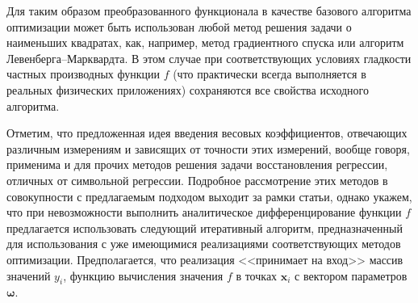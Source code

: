 \documentclass[tikz,10pt,a4paper]{article}
\newcommand{\bomega}{\boldsymbol{\omega}}
\begin{document}

Для таким образом преобразованного функционала
в качестве базового алгоритма оптимизации может
быть использован любой метод решения задачи о наименьших квадратах, как, например,
метод градиентного спуска или алгоритм Левенберга--Марквардта\cite{dlib09}.
В этом случае при
соответствующих условиях гладкости частных производных функции $f$ (что практически
всегда выполняется в реальных физических приложениях) сохраняются все свойства
исходного алгоритма.

Отметим, что предложенная идея введения весовых коэффициентов, отвечающих различным
измерениям и зависящих от точности этих измерений, вообще говоря, применима и для
прочих методов решения задачи восстановления регрессии, отличных от символьной регрессии.
Подробное рассмотрение этих методов в совокупности с предлагаемым подходом выходит за рамки
статьи, однако укажем, что при невозможности выполнить аналитическое
дифференцирование функции $f$ предлагается использовать следующий
итеративный алгоритм, предназначенный для использования с уже имеющимися
реализациями соответствующих методов оптимизации. Предполагается, что реализация
<<принимает на вход>> массив значений $y_i$,
функцию вычисления значения $f$ в точках $\mathbf{x}_i$ с вектором параметров $\bomega$.
\end{document}
